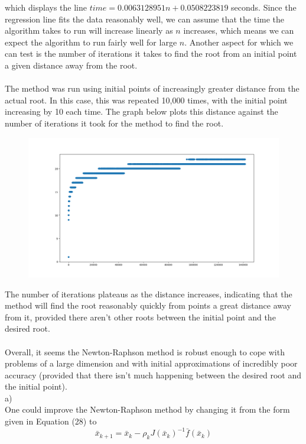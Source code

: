 \documentclass[10pt]{article}
\begin{document}
which displays the line $time = 0.0063128951 n + 0.0508223819$ seconds. Since the regression line fits the data reasonably well, we can assume that the time the algorithm takes to run will increase linearly as $n$ increases, which means we can expect the algorithm to run fairly well for large $n$.
\newpage
Another aspect for which we can test is the number of iterations it takes to find the root from an initial point a given distance away from the root.\\
\\
The method was run using initial points of increasingly greater distance from the actual root. In this case, this was repeated 10,000 times, with the initial point increasing by 10 each time. The graph below plots this distance against the number of iterations it took for the method to find the root.
\begin{figure}[H]
\includegraphics[scale=0.4]{newtonRaphsonPerformanceDistvsIters.png}
\end{figure}
The number of iterations plateaus as the distance increases, indicating that the method will find the root reasonably quickly from points a great distance away from it, provided there aren't other roots between the initial point and the desired root.\\
\\
Overall, it seems the Newton-Raphson method is robust enough to cope with problems of a large dimension and with initial approximations of incredibly poor accuracy (provided that there isn't much happening between the desired root and the initial point).
\\
a)\\
One could improve the Newton-Raphson method by changing it from the form given in Equation (28) to
\begin{equation}
\bar{x}_{k+1} = \bar{x}_{k}-\rho_{k} J(\bar{x}_{k})^{-1}\bar{f}(\bar{x}_{k}) 
\end{equation}
\end{document}
